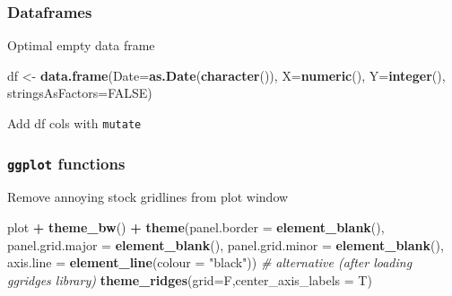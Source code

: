 \documentclass[10,portrait]{article}
\newenvironment{Shaded}{\begin{snugshade}}{\end{snugshade}}
\newcommand{\KeywordTok}[1]{\textcolor[rgb]{0.13,0.29,0.53}{\textbf{#1}}}
\newcommand{\DataTypeTok}[1]{\textcolor[rgb]{0.13,0.29,0.53}{#1}}
\newcommand{\DecValTok}[1]{\textcolor[rgb]{0.00,0.00,0.81}{#1}}
\newcommand{\StringTok}[1]{\textcolor[rgb]{0.31,0.60,0.02}{#1}}
\newcommand{\CommentTok}[1]{\textcolor[rgb]{0.56,0.35,0.01}{\textit{#1}}}
\newcommand{\OtherTok}[1]{\textcolor[rgb]{0.56,0.35,0.01}{#1}}
\newcommand{\OperatorTok}[1]{\textcolor[rgb]{0.81,0.36,0.00}{\textbf{#1}}}
\newcommand{\NormalTok}[1]{#1}
\begin{document}
\subsubsection{Dataframes}\label{dataframes}

Optimal empty data frame

\begin{Shaded}
\begin{Highlighting}[]
\NormalTok{df <-}\StringTok{ }\KeywordTok{data.frame}\NormalTok{(}\DataTypeTok{Date=}\KeywordTok{as.Date}\NormalTok{(}\KeywordTok{character}\NormalTok{()),}
                 \DataTypeTok{X=}\KeywordTok{numeric}\NormalTok{(), }
                 \DataTypeTok{Y=}\KeywordTok{integer}\NormalTok{(), }
                 \DataTypeTok{stringsAsFactors=}\OtherTok{FALSE}\NormalTok{) }
\end{Highlighting}
\end{Shaded}

Add df cols with \texttt{mutate}

\begin{Shaded}
\end{Shaded}

\subsubsection{\texorpdfstring{\texttt{ggplot}
functions}{ggplot functions}}\label{ggplot-functions}

Remove annoying stock gridlines from plot window

\begin{Shaded}
\begin{Highlighting}[]
\NormalTok{plot }\OperatorTok{+}\StringTok{ }\KeywordTok{theme_bw}\NormalTok{() }\OperatorTok{+}\StringTok{ }
\StringTok{  }\KeywordTok{theme}\NormalTok{(}\DataTypeTok{panel.border =} \KeywordTok{element_blank}\NormalTok{(), }\DataTypeTok{panel.grid.major =} \KeywordTok{element_blank}\NormalTok{(),}
                            \DataTypeTok{panel.grid.minor =} \KeywordTok{element_blank}\NormalTok{(), }\DataTypeTok{axis.line =} \KeywordTok{element_line}\NormalTok{(}\DataTypeTok{colour =} \StringTok{"black"}\NormalTok{))}
\CommentTok{# alternative (after loading ggridges library)}
\KeywordTok{theme_ridges}\NormalTok{(}\DataTypeTok{grid=}\NormalTok{F,}\DataTypeTok{center_axis_labels =}\NormalTok{ T)}
\end{Highlighting}
\end{Shaded}
\end{document}
